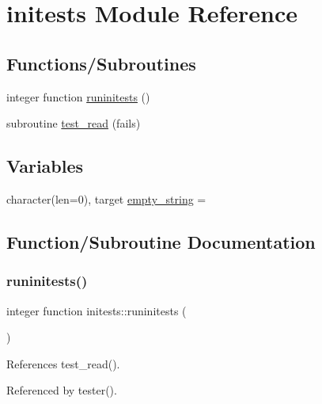 \hypertarget{namespaceinitests}{}\section{initests Module Reference}
\label{namespaceinitests}
\subsection*{Functions/\+Subroutines}
\begin{DoxyCompactItemize}
\item 
integer function \mbox{\hyperlink{namespaceinitests_ae612a57e2f1fcb5a2f8001fcb5259c62}{runinitests}} ()
\item 
subroutine \mbox{\hyperlink{namespaceinitests_a0b26dd9f51d814267992b7a0b9bac310}{test\+\_\+read}} (fails)
\end{DoxyCompactItemize}
\subsection*{Variables}
\begin{DoxyCompactItemize}
\item 
character(len=0), target \mbox{\hyperlink{namespaceinitests_a7c03c5dbd9ffd94ba170d586d799f467}{empty\+\_\+string}} = \textquotesingle{}\textquotesingle{}
\end{DoxyCompactItemize}


\subsection{Function/\+Subroutine Documentation}
\mbox{\label{namespaceinitests_ae612a57e2f1fcb5a2f8001fcb5259c62}} 
\subsubsection{\texorpdfstring{runinitests()}{runinitests()}}
{\footnotesize\ttfamily integer function initests\+::runinitests (\begin{DoxyParamCaption}{ }\end{DoxyParamCaption})}



References test\+\_\+read().



Referenced by tester().

